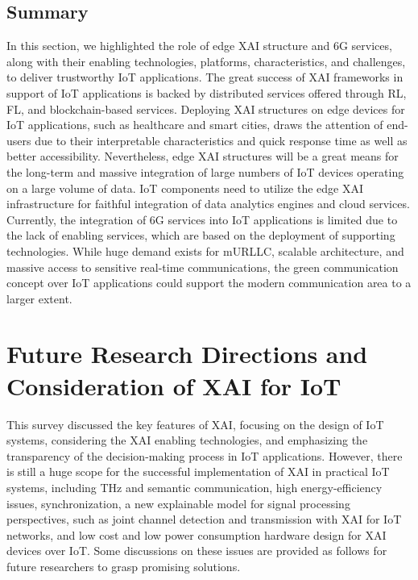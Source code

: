 \documentclass[journal]{IEEEtran}
\begin{document}
\subsection{Summary}
In this section, we highlighted the role of edge XAI structure and 6G services, along with their enabling technologies, platforms, characteristics, and challenges, to deliver trustworthy IoT applications. The great success of XAI frameworks in support of IoT applications is backed by distributed services offered through RL, FL, and blockchain-based services. Deploying XAI structures on edge devices for IoT applications, such as healthcare and smart cities, draws the attention of end-users due to their interpretable characteristics and quick response time as well as better accessibility. Nevertheless, edge XAI structures will be a great means for the long-term and massive integration of large numbers of IoT devices operating on a large volume of data. IoT components need to utilize the edge XAI infrastructure for faithful integration of data analytics engines and cloud services. Currently, the integration of 6G services into IoT applications is limited due to the lack of enabling services, which are based on the deployment of supporting technologies. While huge demand exists for mURLLC, scalable architecture, and massive access to sensitive real-time communications, the green communication concept over IoT applications could support the modern communication area to a larger extent.  

\section{Future Research Directions and Consideration of XAI for IoT}
\label{sec:future}
This survey discussed the key features of XAI, focusing on the design of IoT systems, considering the XAI enabling technologies, and emphasizing the transparency of the decision-making process in IoT applications. However, there is still a huge scope for the successful implementation of XAI in practical IoT systems, including THz and semantic communication, high energy-efficiency issues, synchronization, a new explainable model for signal processing perspectives, such as joint channel detection and transmission with XAI for IoT networks, and low cost and low power consumption hardware design for XAI devices over IoT. Some discussions on these issues are provided as follows for future researchers to grasp promising solutions.
\end{document}
